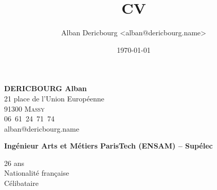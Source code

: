 \documentclass[a4paper]{cv}
\title{CV}
\author{Alban Dericbourg <alban@dericbourg.name>}
\date{\today}
\begin{document}
\begin{chapeau}
\begin{center}
\noindent \begin{minipage}{5cm}
  \begin{flushleft}
    \textbf{DERICBOURG Alban}\\[.25em]
    21 place de l'Union Européenne\\
    91300 \textsc{Massy}\\[.25em]
    \makebox[1.2em][l]{\Mobilefone} \mbox{06 61 24 71 74}\\
    \makebox[1.2em][l]{\Email} alban@dericbourg.name \\[.5em]
  \end{flushleft}
\end{minipage}
\hfill
\begin{minipage}{65mm}
  \begin{center}
  \begin{large}
    \sffamily\textbf{\blue Ingénieur Arts et Métiers ParisTech (ENSAM) -- Supélec}
  \end{large}
  \end{center}
\end{minipage}\hfill
\begin{minipage}{5cm}
  \begin{flushright}
    26 ans \\
    Nationalit\'e fran\c{c}aise \\
    C\'elibataire 
  \end{flushright}
\end{minipage}
\end{center}
\end{chapeau}
\end{document}
